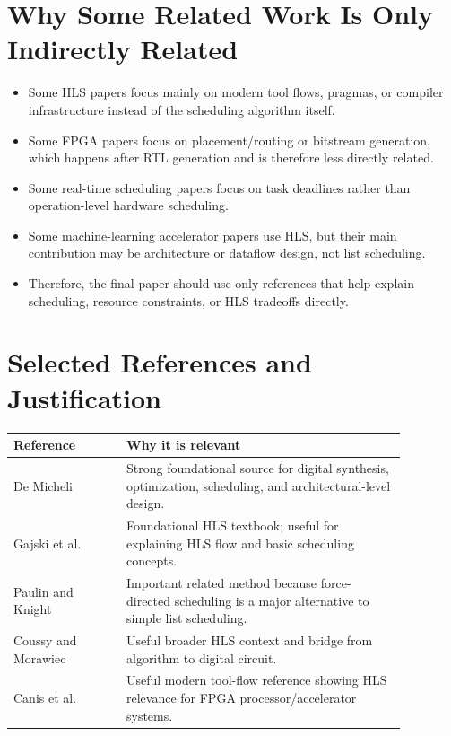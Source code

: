 \documentclass[11pt,a4paper]{article}
\begin{document}
\section{Why Some Related Work Is Only Indirectly Related}

\begin{itemize}[leftmargin=*]
    \item Some HLS papers focus mainly on modern tool flows, pragmas, or compiler infrastructure instead of the scheduling algorithm itself.
    \item Some FPGA papers focus on placement/routing or bitstream generation, which happens after RTL generation and is therefore less directly related.
    \item Some real-time scheduling papers focus on task deadlines rather than operation-level hardware scheduling.
    \item Some machine-learning accelerator papers use HLS, but their main contribution may be architecture or dataflow design, not list scheduling.
    \item Therefore, the final paper should use only references that help explain scheduling, resource constraints, or HLS tradeoffs directly.
\end{itemize}

\section{Selected References and Justification}

\begin{table}[h]
\centering
\small
\begin{tabular}{p{0.25\linewidth}p{0.62\linewidth}}
\toprule
Reference & Why it is relevant \\
\midrule
De Micheli \cite{DeMicheli1994} & Strong foundational source for digital synthesis, optimization, scheduling, and architectural-level design. \\
Gajski et al. \cite{Gajski1992} & Foundational HLS textbook; useful for explaining HLS flow and basic scheduling concepts. \\
Paulin and Knight \cite{PaulinKnight1989} & Important related method because force-directed scheduling is a major alternative to simple list scheduling. \\
Coussy and Morawiec \cite{Coussy2008} & Useful broader HLS context and bridge from algorithm to digital circuit. \\
Canis et al. \cite{Canis2011} & Useful modern tool-flow reference showing HLS relevance for FPGA processor/accelerator systems. \\
\bottomrule
\end{tabular}
\end{table}
\end{document}
